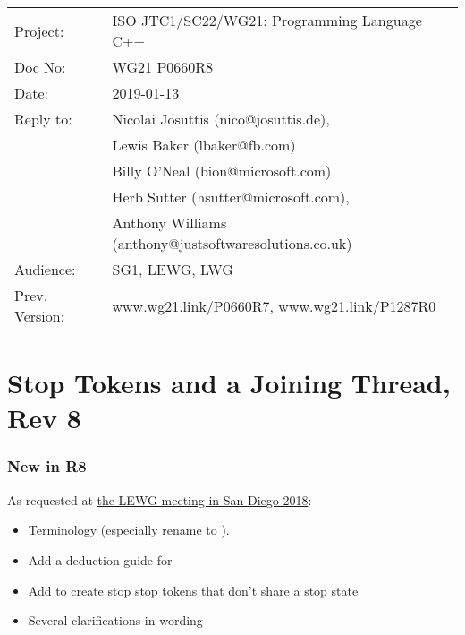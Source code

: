 
{\small
\begin{tabular}{@{}ll}
Project:  	& ISO JTC1/SC22/WG21: Programming Language C++ \\
Doc No: 	& WG21 P0660R8 \\
Date: 		& 2019-01-13 \\
Reply to: 	& Nicolai Josuttis (nico@josuttis.de), \\
                &         Lewis Baker (lbaker@fb.com) \\
                &         Billy O'Neal (bion@microsoft.com) \\
                &         Herb Sutter (hsutter@microsoft.com), \\
                &         Anthony Williams (anthony@justsoftwaresolutions.co.uk) \\
Audience: 	& SG1, LEWG, LWG \\
Prev. Version:	& \url{www.wg21.link/P0660R7}, \url{www.wg21.link/P1287R0} \\
\end{tabular}
}

\section*{{\huge{}Stop Tokens and a Joining Thread, Rev 8}}

\subsubsection*{New in R8}
As requested at
\href{http://wiki.edg.com/bin/view/Wg21sandiego2018/P0660}{the LEWG meeting in San Diego 2018}:
\begin{itemize}
 \item Terminology (especially rename  to ).
 \item Add a deduction guide for 
 \item Add  to create stop stop tokens that don't share a stop state
 \item Several clarifications in wording
\end{itemize}

